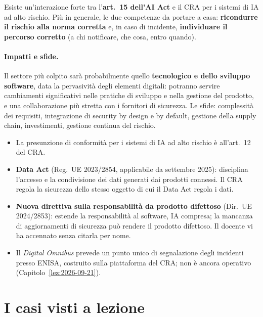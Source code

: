 \begin{esame}
Esiste un'interazione forte tra l'\textbf{art.~15 dell'AI Act} e il CRA per i sistemi di IA ad alto
rischio. Più in generale, le due competenze da portare a casa: \textbf{ricondurre il rischio alla norma
corretta} e, in caso di incidente, \textbf{individuare il percorso corretto} (a chi notificare, che cosa,
entro quando).
\end{esame}

\paragraph{Impatti e sfide.} Il settore più colpito sarà probabilmente quello \textbf{tecnologico e dello
sviluppo software}, data la pervasività degli elementi digitali: potranno servire cambiamenti
significativi nelle pratiche di sviluppo e nella gestione del prodotto, e una collaborazione più stretta
con i fornitori di sicurezza. Le sfide: complessità dei requisiti, integrazione di security by design e by
default, gestione della supply chain, investimenti, gestione continua del rischio.

\begin{integrazione}
\begin{itemize}
  \item La presunzione di conformità per i sistemi di IA ad alto rischio è all'art.~12 del CRA.
  \item \textbf{Data Act} (Reg.~UE 2023/2854, applicabile da settembre 2025): disciplina l'accesso e la
    condivisione dei dati generati dai prodotti connessi. Il CRA regola la sicurezza dello stesso oggetto
    di cui il Data Act regola i dati.
  \item \textbf{Nuova direttiva sulla responsabilità da prodotto difettoso} (Dir.~UE 2024/2853): estende la
    responsabilità al software, IA compresa; la mancanza di aggiornamenti di sicurezza può rendere il
    prodotto difettoso. Il docente vi ha accennato senza citarla per nome.
  \item Il \emph{Digital Omnibus} prevede un punto unico di segnalazione degli incidenti presso ENISA,
    costruito sulla piattaforma del CRA; non è ancora operativo (Capitolo~\ref{lez:2026-09-21}).
\end{itemize}
\end{integrazione}

\section{I casi visti a lezione}
\label{sec:cra-casi}

